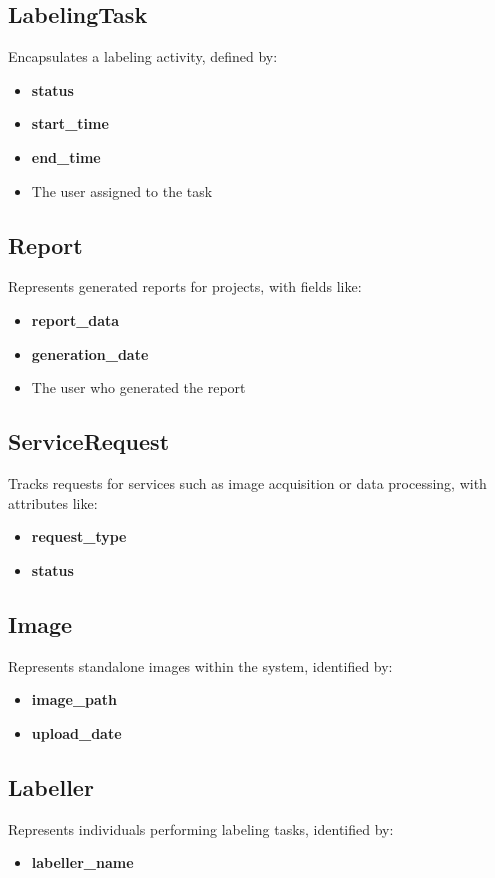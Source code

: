 \documentclass[12pt, titlepage]{article}
\begin{document}
\subsection*{LabelingTask}
Encapsulates a labeling activity, defined by:
\begin{itemize}
    \item \textbf{status}
    \item \textbf{start\_time}
    \item \textbf{end\_time}
    \item The user assigned to the task
\end{itemize}

\subsection*{Report}
Represents generated reports for projects, with fields like:
\begin{itemize}
    \item \textbf{report\_data}
    \item \textbf{generation\_date}
    \item The user who generated the report
\end{itemize}

\subsection*{ServiceRequest}
Tracks requests for services such as image acquisition or data processing, with attributes like:
\begin{itemize}
    \item \textbf{request\_type}
    \item \textbf{status}
\end{itemize}

\subsection*{Image}
Represents standalone images within the system, identified by:
\begin{itemize}
    \item \textbf{image\_path}
    \item \textbf{upload\_date}
\end{itemize}

\subsection*{Labeller}
Represents individuals performing labeling tasks, identified by:
\begin{itemize}
    \item \textbf{labeller\_name}
\end{itemize}
\end{document}
